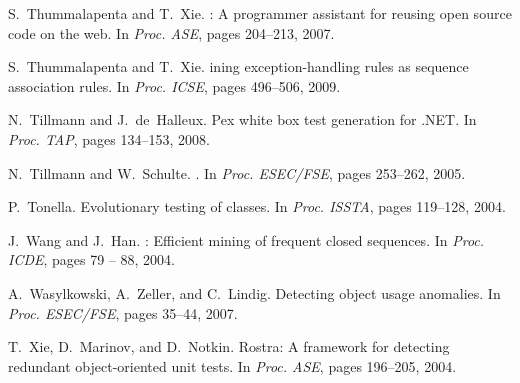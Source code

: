 \documentclass{sig-alternate}
\begin{document}
\begin{thebibliography}{10}
S.~Thummalapenta and T.~Xie.
: A programmer assistant for reusing open source code on
  the web.
\newblock In {\em Proc. ASE}, pages 204--213, 2007.

S.~Thummalapenta and T.~Xie.
ining exception-handling rules as sequence association rules.
\newblock In {\em Proc. ICSE}, pages 496--506, 2009.

N.~Tillmann and J.~de~Halleux.
\newblock Pex white box test generation for .{NET}.
\newblock In {\em Proc. TAP}, pages 134--153, 2008.

N.~Tillmann and W.~Schulte.
.
\newblock In {\em Proc. ESEC/FSE}, pages 253--262, 2005.

P.~Tonella.
\newblock Evolutionary testing of classes.
\newblock In {\em Proc. ISSTA}, pages 119--128, 2004.

J.~Wang and J.~Han.
: Efficient mining of frequent closed sequences.
\newblock In {\em Proc. ICDE}, pages 79 -- 88, 2004.

A.~Wasylkowski, A.~Zeller, and C.~Lindig.
\newblock Detecting object usage anomalies.
\newblock In {\em Proc. ESEC/FSE}, pages 35--44, 2007.

T.~Xie, D.~Marinov, and D.~Notkin.
\newblock Rostra: A framework for detecting redundant object-oriented unit
  tests.
\newblock In {\em Proc. ASE}, pages 196--205, 2004.

\end{thebibliography}
\end{document}
